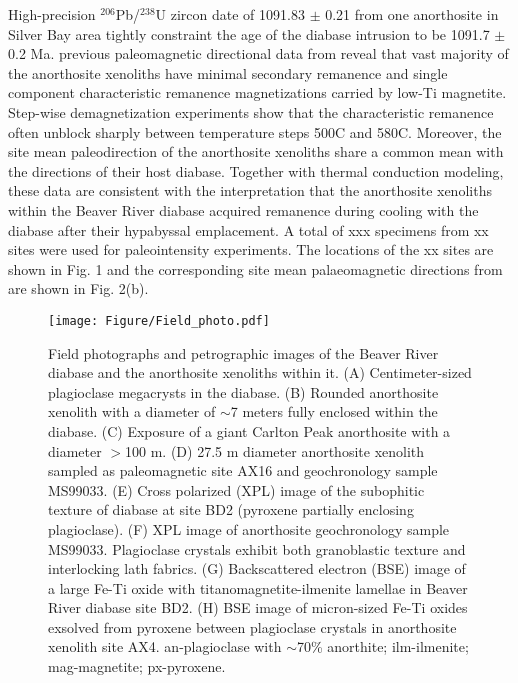 \documentclass[draft]{agujournal2019}
\begin{document}
High-precision $^{206}$Pb/$^{238}$U zircon date of 1091.83 $\pm$ 0.21 from one anorthosite in Silver Bay area tightly constraint the age of the diabase intrusion to be 1091.7 $\pm$ 0.2 Ma. previous paleomagnetic directional data from  reveal that vast majority of the anorthosite xenoliths have minimal secondary remanence and single component characteristic remanence magnetizations carried by low-Ti magnetite. Step-wise demagnetization experiments show that the characteristic remanence often unblock sharply between temperature steps 500\textdegree C and 580\textdegree C. Moreover, the site mean paleodirection of the anorthosite xenoliths share a common mean with the directions of their host diabase. Together with thermal conduction modeling, these data are consistent with the interpretation that the anorthosite xenoliths within the Beaver River diabase acquired remanence during cooling with the diabase after their hypabyssal emplacement. A total of  xxx specimens from xx sites were used for paleointensity experiments. The locations of the xx sites are shown in Fig. 1 and the corresponding site mean palaeomagnetic directions from  are shown in Fig. 2(b).




\begin{figure}
\centering
\noindent\texttt{[image: Figure/Field\_photo.pdf]}
\caption{\footnotesize{Field photographs and petrographic images of the Beaver River diabase and the anorthosite xenoliths within it. (A) Centimeter-sized plagioclase megacrysts in the diabase. (B) Rounded anorthosite xenolith with a diameter of $\sim$7 meters fully enclosed within the diabase. (C) Exposure of a giant Carlton Peak anorthosite with a diameter $>$100 m. (D) 27.5 m diameter anorthosite xenolith sampled as paleomagnetic site AX16 and geochronology sample MS99033. (E) Cross polarized (XPL) image of the subophitic texture of diabase at site BD2 (pyroxene partially enclosing plagioclase). (F) XPL image of anorthosite geochronology sample MS99033. Plagioclase crystals exhibit both granoblastic texture and interlocking lath fabrics. (G) Backscattered electron (BSE) image of a large Fe-Ti oxide with titanomagnetite-ilmenite lamellae in Beaver River diabase site BD2. (H) BSE image of micron-sized Fe-Ti oxides exsolved from pyroxene between plagioclase crystals in anorthosite xenolith site AX4. an-plagioclase with $\sim$70\% anorthite; ilm-ilmenite; mag-magnetite; px-pyroxene.}}
\label{fig:Field_photo}
\end{figure}
\end{document}
